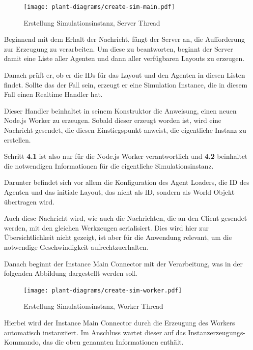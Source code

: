 \begin{figure}[htb!]
    \centering
    \texttt{[image: plant-diagrams/create-sim-main.pdf]}
    \caption{Erstellung Simulationsinstanz, Server Thread}
    \ownsource
    \label{fig:create-sim-main}
\end{figure}


Beginnend mit dem Erhalt der Nachricht, fängt der Server an, die Aufforderung zur Erzeugung zu verarbeiten.
Um diese zu beantworten, beginnt der Server damit eine Liste aller Agenten und dann aller verfügbaren Layouts zu erzeugen.

Danach prüft er, ob er die IDs für das Layout und den Agenten in diesen Listen findet.
Sollte das der Fall sein, erzeugt er eine Simulation Instance, die in diesem Fall einen Realtime Handler hat.

Dieser Handler beinhaltet in seinem Konstruktor die Anweisung, einen neuen Node.js Worker zu erzeugen.
Sobald dieser erzeugt worden ist, wird eine Nachricht gesendet, die diesen Einstiegspunkt anweist, die eigentliche Instanz zu erstellen.

Schritt \textbf{4.1} ist also nur für die Node.js Worker verantwortlich und \textbf{4.2} beinhaltet die notwendigen Informationen für die eigentliche Simulationsinstanz.

Darunter befindet sich vor allem die Konfiguration des Agent Loaders, die ID des Agenten und das initiale Layout, das nicht als ID, sondern als World Objekt übertragen wird.

Auch diese Nachricht wird, wie auch die Nachrichten, die an den Client gesendet werden, mit den gleichen Werkzeugen serialisiert.
Dies wird hier zur Übersichtlichkeit nicht gezeigt, ist aber für die Anwendung relevant, um die notwendige Geschwindigkeit aufrechtzuerhalten.

Danach beginnt der Instance Main Connector mit der Verarbeitung, was in der folgenden Abbildung dargestellt werden soll.

\begin{figure}[htb]
    \centering
    \texttt{[image: plant-diagrams/create-sim-worker.pdf]}
    \caption{Erstellung Simulationsinstanz, Worker Thread}
    \ownsource
    \label{fig:create-sim-worker}
\end{figure}


Hierbei wird der Instance Main Connector durch die Erzeugung des Workers automatisch instanziiert.
Im Anschluss wartet dieser auf das Instanzerzeugungs-Kommando, das die oben genannten Informationen enthält.

